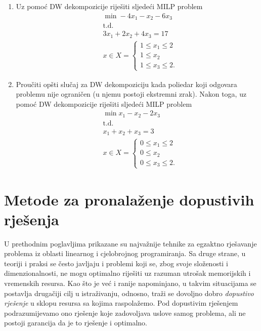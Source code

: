 \documentclass[a4paper, utf8, 11pt, colorlinks]{book}
\theoremstyle{definition}
\begin{document}
\begin{enumerate}
\item %
	Uz pomoć   DW dekompozicije riješiti sljedeći MILP problem
\begin{align*}
	 &\min -4x_1 - x_2 - 6 x_3 \\
	 &\mbox{t.d.} \\
	 & 3 x_1 + 2 x_2 + 4 x_3 = 17 \\
	 & x \in X = \begin{cases}
	 	1 \leq x_1 \leq 2 \\
	 	1 \leq x_2 \\
	    1 \leq x_3 \leq 2. 
	 \end{cases}
\end{align*}
\item %
    Proučiti opšti slučaj za DW dekompoziciju kada poliedar koji odgovara problemu nije ograničen (u njemu postoji ekstremni zrak). Nakon toga, uz pomoć DW dekompozicije riješiti sljedeći MILP problem
	\begin{align*}
		 &\min x_1 - x_2 - 2 x_3 \\
		 &\mbox{t.d.} \\
		 & x_1 + x_2 + x_3 = 3 \\
		 & x \in X = \begin{cases}
		 	        0 \leq x_1 \leq 2 \\
		 	        0 \leq x_2 \\
		 	        0 \leq x_3 \leq 2. 
		 \end{cases}
	\end{align*}

\end{enumerate}



 \chapter{Metode za pronalaženje dopustivih rješenja}\label{chp:heuristike}
 
 U prethodnim poglavljima prikazane su najvažnije tehnike za egzaktno rješavanje problema iz oblasti linearnog i cjelobrojnog programiranja. Sa druge strane, u teoriji i praksi se često javljaju i problemi koji se, zbog svoje složenosti i dimenzionalnosti, ne mogu optimalno riješiti uz razuman utrošak memorijskih i vremenskih resursa. Kao što je već i ranije napominjano, u takvim situacijama se postavlja drugačiji cilj u istraživanju, odnosno, traži se dovoljno dobro \emph{dopustivo rješenje} u sklopu resursa sa kojima raspolažemo. Pod dopustivim rješenjem podrazumijevamo ono rješenje koje zadovoljava uslove samog problema, ali ne postoji garancija da je to rješenje i optimalno.
 
\end{document}
